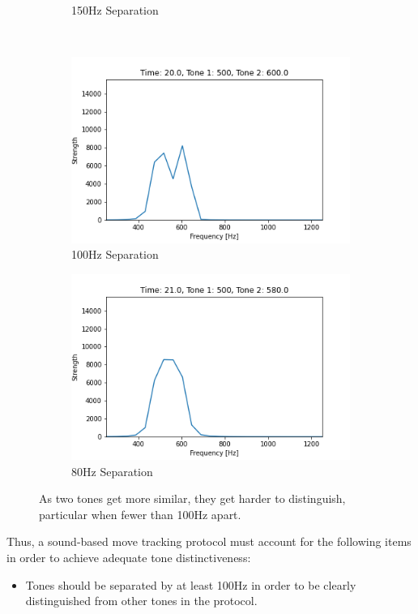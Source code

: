 \begin{figure}[h]
\begin{subfigure}{0.5\textwidth}
        \caption{150Hz Separation}
        \label{fig:tone-sep-150}
    \end{subfigure}\\
    \begin{subfigure}{0.5\textwidth}
        \centering
        \includegraphics[width=.90\linewidth]{Figures/4 Protocol Design/Tone Distinctiveness/20.03.png}
        \caption{100Hz Separation}
        \label{fig:tone-sep-100}
    \end{subfigure}%
    \begin{subfigure}{0.5\textwidth}
        \centering
        \includegraphics[width=.90\linewidth]{Figures/4 Protocol Design/Tone Distinctiveness/21.01.png}
        \caption{80Hz Separation}
        \label{fig:tone-sep-80}
    \end{subfigure}%
    \caption{As two tones get more similar, they get harder to distinguish, particular when fewer than 100Hz apart.}
    \label{fig:tone-sep}
\end{figure}

Thus, a sound-based move tracking protocol must account for the following items in order to achieve adequate tone distinctiveness:
\begin{itemize}
    \item Tones should be separated by at least 100Hz in order to be clearly distinguished from other tones in the protocol.
\end{itemize}


